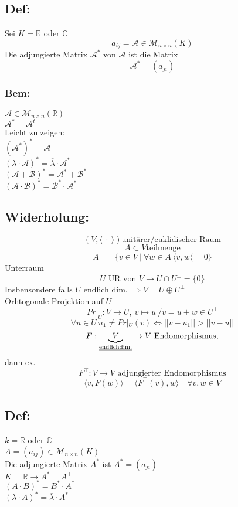 \documentclass[titlepage,12pt,a4paper,ngerman]{report}
\newcommand{\tx}[1]{\textrm{#1}}
\begin{document}
\subsection{Def:}
Sei $ K = \mathbb{R}$ oder $\mathbb{C} $\\
$$ a_{ij} = \mathcal{A} \in \mathcal{M}_{n\times n} (K) $$
Die adjungierte Matrix $ \mathcal{A}^* $ von $ \mathcal{A} $ ist die Matrix
$$ \mathcal{A}^* = ( \overline{a_{ji}})$$
\subsubsection{Bem:}
$ \mathcal{A} \in \mathcal{M}_{n \times n} (\mathbb{R}) $\\
$ \mathcal{A}^* = \mathcal{A}^t $\\
Leicht zu zeigen:\\
$ (\mathcal A^*)^* = \mathcal A $\\
$ (\lambda \cdot \mathcal{A})^* = \overline{\lambda} \cdot \mathcal{A}^* $\\
$ (\mathcal{A} + \mathcal{B})^* = \mathcal{A}^* + \mathcal{B}^* $\\
$ (\mathcal{A} \cdot \mathcal{B})^* = \mathcal{B}^* \cdot \mathcal{A}^* $


\subsection*{Widerholung:}

$$(V, \langle\ \cdot\ \rangle) \tx{unitärer/euklidischer Raum}$$
$$A \subset V \tx{teilmenge}$$
$$A^\perp = \{v \in V\ |\ \forall w \in A\ \langle v,w \langle = 0\}$$
Unterraum
$$U \tx{ UR von } V \to U \cap U^\perp =\{0\}$$
Insbensondere falls $U$ endlich dim. $\Rightarrow V = U \oplus U^\perp$\\
Orhtogonale Projektion auf $U$ $$Pr|_U : V \to U,\ v \mapsto u\ / v = u + w \in U^\perp$$
$$\forall u \in U\ u_1 \neq Pr|_U(v) \Leftrightarrow ||v-u_1||> ||v-u||$$
$$F: \underbrace{V}_{\tx{\underline{endlichdim.}}} \to V \tx{ Endomorphismus,}$$ dann ex. 
$$F^\top : V \to V \tx{ adjungierter Endomorphismus}$$
$$\underline{\langle v, F(w) \rangle = \langle F^\top (v) ,w \rangle} \quad \forall v,w \in V$$

\subsection{Def:}
$ k= \mathbb{R} $ oder $ \mathbb{C} $\\
$ A = (a_{ij}) \in \mathcal{M}_{n\times n}(K) $\\
Die adjungierte Matrix $ A^* $ ist $ A^* = (\overline{a_{ji}}) $\\
$ K = \mathbb{R} \to A^* = A^\top $\\
$ (A \cdot B)^* = B^* \cdot A^* $\\
$ (\lambda \cdot A)^* = \overline{\lambda} \cdot A^* $\\
\end{document}
